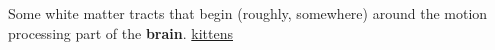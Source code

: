 Some white matter tracts that begin (roughly, somewhere) around the motion processing part of the \textbf{brain}. \href{writtenkitten.net}{kittens
}